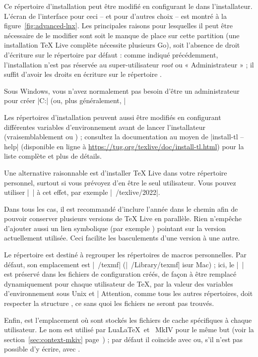 \documentclass[german, english, french]{article}
\renewcommand{\TL}{\TeX{} Live\xspace}%
\newcommand\eng[1]{\foreignlanguage{english}{\emph{#1}}}
\begin{document}
Ce répertoire d'installation peut être modifié en configurant le
 dans l'installateur. L'écran de l'interface pour ceci -- et
pour d'autres choix -- est montré à la figure~\ref{fig:advanced-lnx}.  Les
principales raisons pour lesquelles il peut être nécessaire de le modifier sont
soit le manque de place sur cette partition (une installation \TL{} complète
nécessite plusieurs Go), soit l'absence de droit d'écriture sur le répertoire
par défaut : comme indiqué précédemment, l'installation n'est pas réservée au
super-utilisateur \eng{root} ou « Administrateur » ; il suffit d'avoir les
droits en écriture sur le répertoire .

Sous Windows, vous n'avez normalement pas besoin d'être un administrateur pour
créer |C:\texlive{}| (ou, plus généralement, |%

Les répertoires d'installation peuvent aussi être modifiés en configurant
différentes variables d'environnement avant de lancer l'installateur
(vraisemblablement  ou
) ; consultez la documentation au moyen de
|install-tl --help| (disponible en ligne
à \url{https://tug.org/texlive/doc/install-tl.html}) pour la liste complète et
plus de détails.

Une alternative raisonnable est d'installer \TL{} dans votre répertoire
personnel, surtout si vous prévoyez d'en être le seul utilisateur. Vous pouvez
utiliser |~| à cet effet, par exemple |~/texlive/2022|.

Dans tous les cas, il est recommandé d'inclure l'année dans le chemin afin de
pouvoir conserver plusieurs versions de \TL{} en parallèle.  Rien n'empêche
d'ajouter aussi un lien symbolique (par exemple
) pointant sur la version actuellement
utilisée. Ceci facilite les basculements d'une version à une autre.

Le répertoire  est destiné à regrouper les répertoires de
macros personnelles. Par défaut, son emplacement est |~/texmf|
(|~/Library/texmf| isur Mac) ; ici, le |~| est préservé dans les fichiers de
configuration créés, de façon à être remplacé dynamiquement pour chaque
utilisateur de \TeX, par la valeur des variables d'environnement
sous Unix et |%
Attention, comme tous les autres répertoires,  doit respecter
la structure \TDS{}, ce sans quoi les fichiers ne seront pas trouvés.

Enfin,  est l'emplacement où sont stockés les fichiers de
cache spécifiques à chaque utilisateur. Le nom  est utilisé
par Lua\LaTeX\ et \ConTeXt\ MkIV pour le même but (voir la
section~\ref{sec:context-mkiv} page~\pageref{sec:context-mkiv}) ; par défaut il
coïncide avec  ou, s'il n'est pas possible d'y écrire, avec
.
\end{document}
